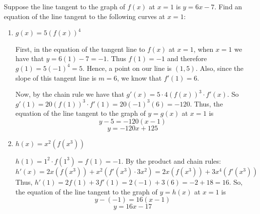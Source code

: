 \documentclass[nooutcomes]{ximera}
\begin{document}
\begin{problem}
Suppose the line tangent to the graph of $f(x)$ at $x=1$ is $y=6x-7$.  Find an equation of the line tangent to the following curves at $x=1$:
	\begin{enumerate}
	
	\item  $g(x) = 5(f(x))^4$  
		\begin{freeResponse}
		First, in the equation of the tangent line to $f(x)$ at $x=1$, when $x=1$ we have that $y= 6(1) - 7 = -1$.  Thus $f(1) = -1$ and therefore $g(1) = 5(-1)^4 = 5$.  Hence, a point on our line is $(1,5)$.  Also, since the slope of this tangent line is $m=6$, we know that $f'(1) = 6$.
		
		Now, by the chain rule we have that $g'(x) = 5 \cdot 4 (f(x))^3 \cdot f'(x)$.  So $g'(1) = 20(f(1))^3 \cdot f'(1) = 20(-1)^3 (6) = -120.$  Thus, the equation of the line tangent to the graph of $y = g(x)$ at $x=1$ is
		$$ y - 5 = -120(x-1) $$
		$$ y = -120x + 125 $$
		\end{freeResponse}

	\item  $h(x) = x^2 (f(x^3))$
		\begin{freeResponse}
		$h(1) = 1^2 \cdot f(1^3) = f(1) = -1$.  By the product and chain rules:
		$$ h'(x) = 2x(f(x^3)) + x^2(f'(x^3) \cdot 3x^2) = 2x(f(x^3)) + 3x^4(f'(x^3)) $$
		Thus, $h'(1) = 2f(1) + 3f'(1) = 2(-1) + 3(6) = -2 + 18 = 16$.  So, the equation of the line tangent to the graph of $y=h(x)$ at $x=1$ is
		$$ y- (-1) = 16(x-1) $$
		$$ y = 16x - 17 $$
		\end{freeResponse}
	\end{enumerate}		
		
		
	
\end{problem}
\end{document}
